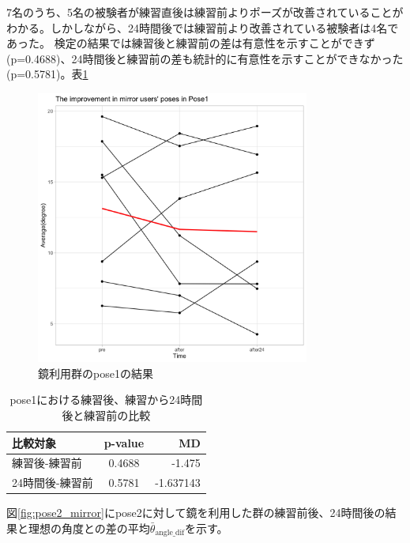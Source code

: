       7名のうち、5名の被験者が練習直後は練習前よりポーズが改善されていることがわかる。しかしながら、24時間後では練習前より改善されている被験者は4名であった。
      検定の結果では練習後と練習前の差は有意性を示すことができず(p=0.4688)、24時間後と練習前の差も統計的に有意性を示すことができなかった(p=0.5781)。表\ref{table:pose1_mirror_p_value}

      \begin{figure}[H]
        \begin{center}
        \includegraphics[width=9cm]{figures/pose1_system_false_graph.png}
        \caption{鏡利用群のpose1の結果}
        \label{fig:pose1_mirror}
        \end{center}
      \end{figure}

      \begin{table}[ht]
        \centering
        \caption{pose1における練習後、練習から24時間後と練習前の比較}
        \begin{tabular}{lcr}
        \hline
        \textbf{比較対象} & \textbf{p-value} & \textbf{MD} \\ \hline
        練習後-練習前 & 0.4688 & -1.475 \\ \hline
        24時間後-練習前 & 0.5781 & -1.637143 \\ \hline
        \end{tabular}
        \label{table:pose1_mirror_p_value}
        \end{table}

        図\ref{fig:pose2_mirror}にpose2に対して鏡を利用した群の練習前後、24時間後の結果と理想の角度との差の平均\(\bar{\theta}_{\text{angle\_dif}}\)を示す。


